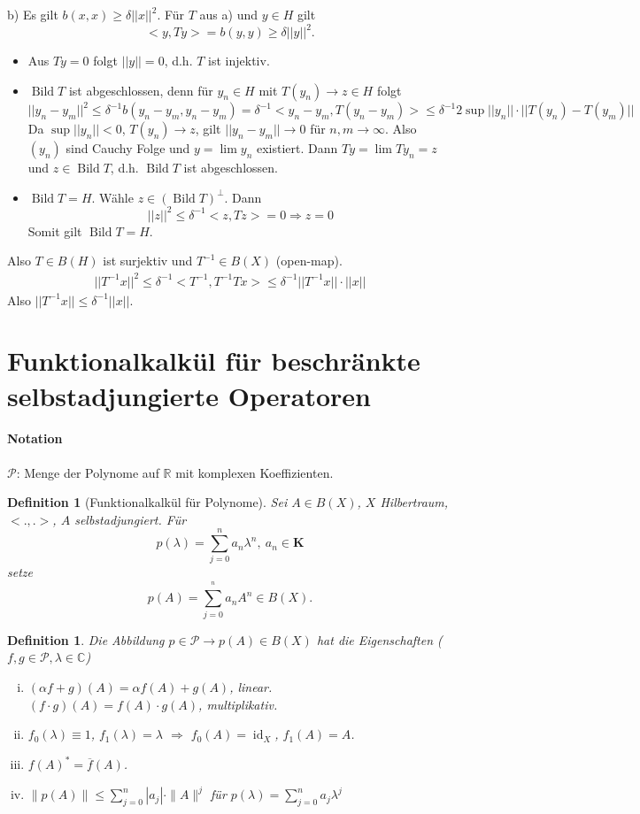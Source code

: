 \documentclass[12pt]{extreport} %
\newtheorem{Definition}[Satz]{Definition}
\DeclareMathOperator{\Bild}{Bild}
\DeclareMathOperator{\id}{id}
\numberwithin{equation}{section}
\newcommand{\C}{\mathbb{C}} %
\newcommand{\R}{\mathbb{R}} %
\newcommand{\m}{\cdot}
\begin{document}
	b) Es gilt $b(x,x) \geq \delta ||x||^2$. Für $T$ aus a) und $y\in H$ gilt 
	$$<y, Ty> = b(y,y)\geq \delta ||y||^2.$$
	\begin{itemize}
		\item Aus $Ty = 0$ folgt $||y|| = 0$, d.h. $T$ ist injektiv.
		\item $\Bild T$ ist abgeschlossen, denn für $y_n\in H$ mit $T(y_n)\rightarrow z\in H$ folgt 
		$$||y_n-y_m||^2\leq \delta^{-1} b(y_n-y_m,y_n-y_m) = \delta^{-1}<y_n-y_m,T(y_n-y_m)> \leq \delta^{-1}2\sup ||y_n||\m||T(y_n)-T(y_m)||$$
		Da $\sup ||y_n||<0$, $T(y_n)\rightarrow z$, gilt $||y_n-y_m||\rightarrow 0$ für $n,m\rightarrow \infty$. Also $(y_n)$ sind Cauchy Folge und $y=\lim y_n$ existiert. Dann $Ty=\lim Ty_n = z$ und $z\in \Bild T$, d.h. $\Bild T$ ist abgeschlossen.
		\item $\Bild T = H$. Wähle $z\in (\Bild T)^{\perp}$. Dann 
		$$||z||^2\leq \delta^{-1}<z,Tz> = 0\Rightarrow z= 0$$
		Somit gilt $\Bild T = H$.
	\end{itemize}
	Also $T\in B(H)$ ist surjektiv und $T^{-1}\in B(X)$ (open-map).
	\begin{eqnarray}
		||T^{-1}x||^2\leq \delta^{-1}<T^{-1}, T^{-1}Tx> \leq \delta^{-1}||T^{-1}x||\m ||x||\nonumber
	\end{eqnarray}
	Also $||T^{-1}x||\leq \delta^{-1}||x||$.
	
	\section{Funktionalkalkül für beschränkte selbstadjungierte Operatoren}
	
	\paragraph{Notation} $\mathcal{P}$: Menge der Polynome auf $\R$ mit komplexen Koeffizienten. 
	
	\begin{Definition}[Funktionalkalkül für Polynome]
		Sei $A\in B(X)$, $X$ Hilbertraum, $<.,.>$, $A$ selbstadjungiert. Für 
		$$p(\lambda) = \sum_{j = 0}^{n} a_n\lambda^n, ~ a_n\in \mathbf{K}$$
		setze 
		$$p(A) = \sum_{j = 0}^{^n}a_n A^n\in B(X).$$
	\end{Definition}
	
	\begin{Definition}
		Die Abbildung $p\in\mathcal{P}\rightarrow p(A) \in B(X)$ hat die Eigenschaften ($f,g\in \mathcal{P}, \lambda\in \C$)
		\begin{enumerate}[(i)]
			\item $(\alpha f +g)(A) = \alpha f(A)+g(A)$, linear. \\
			$(f\m g)(A) = f(A)\m g(A)$, multiplikativ.
			\item $f_0(\lambda)\equiv 1$, $f_1(\lambda) =\lambda$ $\Rightarrow$ $f_0(A) = \id_X$, $f_1(A) = A$.
			\item $f(A)^* =\overline{f}(A)$.
			\item $\boxed{\|p(A)\|\leq \sum_{j = 0}^{n}|a_j|\m\|A\|^j}$ für $p(\lambda) = \sum_{j = 0}^{n} a_j\lambda^j$
		\end{enumerate}
	\end{Definition}
	
\end{document}
